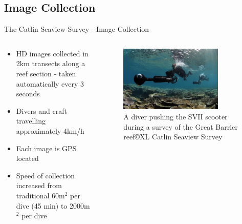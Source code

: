 \documentclass{beamer}
\begin{document}
        \subsection{Image Collection}
            \begin{frame}{The Catlin Seaview Survey - Image Collection }
              \begin{columns}[T]
                \begin{column}{0.48\textwidth}
                  \centering
                  \begin{itemize}
                    \item HD images collected in 2km transects along a reef section - taken automatically every 3 seconds
                    \item Divers and craft travelling approximately 4km/h
                    \item Each image is GPS located
                    \item Speed of collection increased from traditional $60$m$^2$ per dive (45 min) to $2000$m$^2$ per dive
                  \end{itemize}
                \end{column}
                \begin{column}{0.48\textwidth}
                  \begin{figure}
                      \centering
                      \includegraphics[width = 0.8\textwidth]{SVII.jpg}
                      \caption{{\footnotesize A diver pushing the SVII scooter during a survey of the Great Barrier reef\footnotemark  \copyright XL Catlin Seaview Survey}}
                  \end{figure}

                \end{column}
              \end{columns}
            \end{frame}
\end{document}
